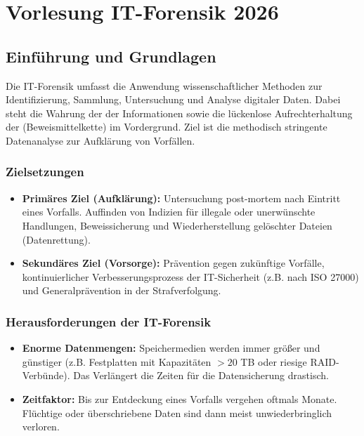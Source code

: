 \documentclass[
../../css_summary.tex,
]{subfiles}
\begin{document}
\section{Vorlesung IT-Forensik 2026}

\subsection{Einführung und Grundlagen}

\begin{defbox}
  Die IT-Forensik umfasst die Anwendung wissenschaftlicher Methoden zur Identifizierung, Sammlung, Untersuchung und Analyse digitaler Daten. Dabei steht die Wahrung der  der Informationen sowie die lückenlose Aufrechterhaltung der  (Beweismittelkette) im Vordergrund. Ziel ist die methodisch stringente Datenanalyse zur Aufklärung von Vorfällen.
\end{defbox}

\subsubsection{Zielsetzungen}
\begin{itemize}
  \item \textbf{Primäres Ziel (Aufklärung):} Untersuchung post-mortem nach Eintritt eines Vorfalls. Auffinden von Indizien für illegale oder unerwünschte Handlungen, Beweissicherung und Wiederherstellung gelöschter Dateien (Datenrettung).
  \item \textbf{Sekundäres Ziel (Vorsorge):} Prävention gegen zukünftige Vorfälle, kontinuierlicher Verbesserungsprozess der IT-Sicherheit (z.B. nach ISO 27000) und Generalprävention in der Strafverfolgung.
\end{itemize}

\subsubsection{Herausforderungen der IT-Forensik}
\begin{itemize}
  \item \textbf{Enorme Datenmengen:} Speichermedien werden immer größer und günstiger (z.B. Festplatten mit Kapazitäten $> 20$ TB oder riesige RAID-Verbünde). Das Verlängert die Zeiten für die Datensicherung drastisch.
  \item \textbf{Zeitfaktor:} Bis zur Entdeckung eines Vorfalls vergehen oftmals Monate. Flüchtige oder überschriebene Daten sind dann meist unwiederbringlich verloren.
\end{itemize}
\end{document}
